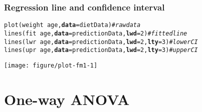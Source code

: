 \documentclass[color=usenames,dvipsnames]{beamer}\usepackage[]{graphicx}\usepackage[]{color}
\makeatletter
\newcommand{\hlnum}[1]{\textcolor[rgb]{0.69,0.494,0}{#1}}%
\newcommand{\hlcom}[1]{\textcolor[rgb]{0.514,0.506,0.514}{\textit{#1}}}%
\newcommand{\hlopt}[1]{\textcolor[rgb]{0,0,0}{#1}}%
\newcommand{\hlstd}[1]{\textcolor[rgb]{0,0,0}{#1}}%
\newcommand{\hlkwc}[1]{\textcolor[rgb]{0,0,0}{\textbf{#1}}}%
\newcommand{\hlkwd}[1]{\textcolor[rgb]{0.004,0.004,0.506}{#1}}%
\newenvironment{kframe}{%
 \def\at@end@of@kframe{}%
 \ifinner\ifhmode%
  \def\at@end@of@kframe{\end{minipage}}%
  \begin{minipage}{\columnwidth}%
 \fi\fi%
 \def\FrameCommand##1{\hskip\@totalleftmargin \hskip-\fboxsep
 \colorbox{shadecolor}{##1}\hskip-\fboxsep
     \hskip-\linewidth \hskip-\@totalleftmargin \hskip\columnwidth}%
 \MakeFramed {\advance\hsize-\width
   \@totalleftmargin\z@ \linewidth\hsize
   \@setminipage}}%
 {\par\unskip\endMakeFramed%
 \at@end@of@kframe}
\newenvironment{knitrout}{}{} %
\makeatother
\begin{document}
\begin{frame}[fragile]
  \frametitle{Regression line and confidence interval}
  \scriptsize
\begin{knitrout}\scriptsize
{}\color{fgcolor}\begin{kframe}
\begin{alltt}
\hlkwd{plot}\hlstd{(weight} \hlopt{~} \hlstd{age,} \hlkwc{data}\hlstd{=dietData)}                   \hlcom{# raw data}
\hlkwd{lines}\hlstd{(fit} \hlopt{~} \hlstd{age,} \hlkwc{data}\hlstd{=predictionData,} \hlkwc{lwd}\hlstd{=}\hlnum{2}\hlstd{)}        \hlcom{# fitted line}
\hlkwd{lines}\hlstd{(lwr} \hlopt{~} \hlstd{age,} \hlkwc{data}\hlstd{=predictionData,} \hlkwc{lwd}\hlstd{=}\hlnum{2}\hlstd{,} \hlkwc{lty}\hlstd{=}\hlnum{3}\hlstd{)} \hlcom{# lower CI}
\hlkwd{lines}\hlstd{(upr} \hlopt{~} \hlstd{age,} \hlkwc{data}\hlstd{=predictionData,} \hlkwc{lwd}\hlstd{=}\hlnum{2}\hlstd{,} \hlkwc{lty}\hlstd{=}\hlnum{3}\hlstd{)} \hlcom{# upper CI}
\end{alltt}
\end{kframe}
\end{knitrout}
  \vspace{-9mm}
  \begin{center}
    \texttt{[image: figure/plot-fm1-1]}
  \end{center}
\end{frame}



\section{One-way ANOVA}
\end{document}
